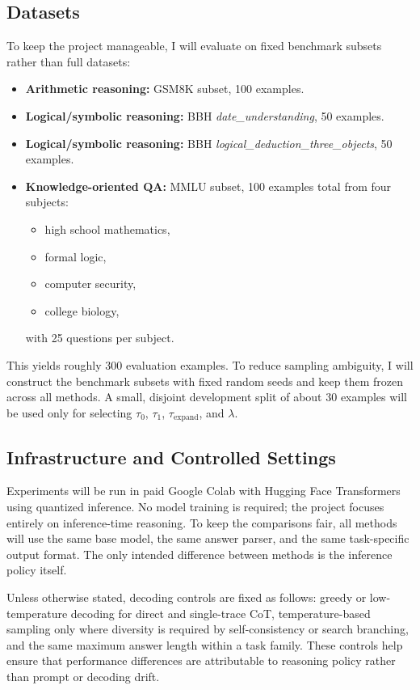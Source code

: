 \documentclass[10pt]{article}
\begin{document}
\subsection{Datasets}
To keep the project manageable, I will evaluate on fixed benchmark subsets rather than full datasets:
\begin{itemize}[leftmargin=1.2em,itemsep=0.08em]
    \item \textbf{Arithmetic reasoning:} GSM8K subset, 100 examples.
    \item \textbf{Logical/symbolic reasoning:} BBH \textit{date\_understanding}, 50 examples.
    \item \textbf{Logical/symbolic reasoning:} BBH \textit{logical\_deduction\_three\_objects}, 50 examples.
    \item \textbf{Knowledge-oriented QA:} MMLU subset, 100 examples total from four subjects:
    \begin{itemize}[leftmargin=1.2em,itemsep=0.04em]
        \item high school mathematics,
        \item formal logic,
        \item computer security,
        \item college biology,
    \end{itemize}
    with 25 questions per subject.
\end{itemize}
This yields roughly 300 evaluation examples. To reduce sampling ambiguity, I will construct the benchmark subsets with fixed random seeds and keep them frozen across all methods. A small, disjoint development split of about 30 examples will be used only for selecting $\tau_0$, $\tau_1$, $\tau_{\mathrm{expand}}$, and $\lambda$.

\subsection{Infrastructure and Controlled Settings}
Experiments will be run in paid Google Colab with Hugging Face Transformers using quantized inference. No model training is required; the project focuses entirely on inference-time reasoning. To keep the comparisons fair, all methods will use the same base model, the same answer parser, and the same task-specific output format. The only intended difference between methods is the inference policy itself.

Unless otherwise stated, decoding controls are fixed as follows: greedy or low-temperature decoding for direct and single-trace CoT, temperature-based sampling only where diversity is required by self-consistency or search branching, and the same maximum answer length within a task family. These controls help ensure that performance differences are attributable to reasoning policy rather than prompt or decoding drift.
\end{document}
